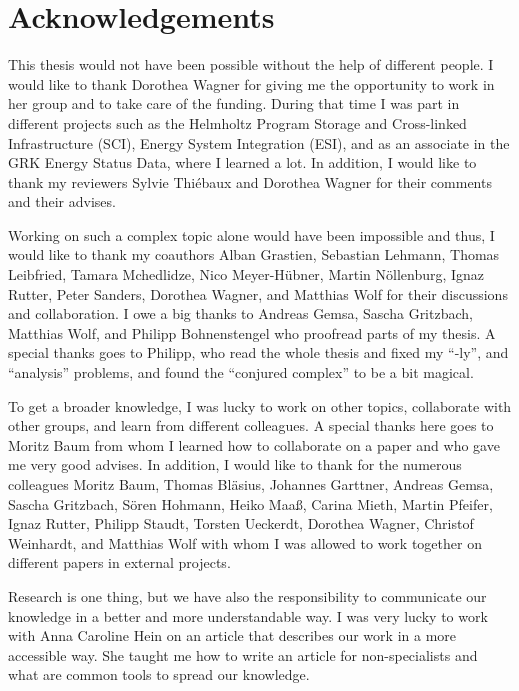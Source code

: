 \chapter*{Acknowledgements}
% 
This thesis would not have been possible without the help of different people. I
would like to thank Dorothea Wagner for giving me the opportunity to work in her
group and to take care of the funding. During that time I was part in different
projects such as the Helmholtz Program Storage and Cross-linked Infrastructure
(SCI), Energy System Integration (ESI), and as an associate in the GRK Energy
Status Data, where I learned a lot. In addition, I would like to thank my
reviewers Sylvie Thi\'ebaux and Dorothea Wagner for their comments and their
advises.

Working on such a complex topic alone would have been impossible and thus, I
would like to thank my coauthors Alban Grastien, Sebastian Lehmann, Thomas
Leibfried, Tamara Mchedlidze, Nico Meyer-Hübner, Martin Nöllenburg, Ignaz
Rutter, Peter Sanders, Dorothea Wagner, and Matthias Wolf for their discussions
and collaboration. I owe a big thanks to Andreas Gemsa, Sascha Gritzbach,
Matthias Wolf, and Philipp Bohnenstengel who proofread parts of my thesis. A
special thanks goes to Philipp, who read the whole thesis and fixed my ``-ly'',
and ``analysis'' problems, and found the ``conjured complex'' to be a bit
magical.

To get a broader knowledge, I was lucky to work on other topics, collaborate
with other groups, and learn from different colleagues. A special thanks here
goes to Moritz Baum from whom I learned how to collaborate on a paper and who
gave me very good advises. In addition, I would like to thank for the numerous
colleagues Moritz Baum, Thomas Bl\"asius, Johannes Garttner, Andreas Gemsa,
Sascha Gritzbach, S\"oren Hohmann, Heiko Maa{\ss}, Carina Mieth, Martin Pfeifer,
Ignaz Rutter, Philipp Staudt, Torsten Ueckerdt, Dorothea Wagner, Christof
Weinhardt, and Matthias Wolf with whom I was allowed to work together on
different papers in external projects.

Research is one thing, but we have also the responsibility to communicate our
knowledge in a better and more understandable way. I was very lucky to work with
Anna Caroline Hein on an article that describes our work in a more accessible
way. She taught me how to write an article for non-specialists and what are
common tools to spread our knowledge.

